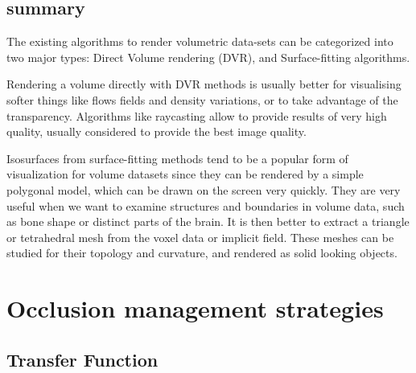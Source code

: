 \subsection{summary}
The existing algorithms to render volumetric data-sets  can be categorized into two major types: Direct Volume rendering (DVR), and Surface-fitting algorithms.


Rendering a volume directly with DVR methods is usually better for visualising softer things like flows fields and density variations, or to take advantage of the transparency. Algorithms like raycasting allow to provide results of very high quality, usually considered to provide the best image quality. 


Isosurfaces from surface-fitting methods tend to be a popular form of visualization for volume datasets since they can be rendered by a simple polygonal model, which can be drawn on the screen very quickly. They are very useful when we want to examine structures and boundaries in volume data, such as bone shape or distinct parts of the brain. It is then better to extract a triangle or tetrahedral mesh from the voxel data or implicit field. These meshes can be studied for their topology and curvature, and rendered as solid looking objects.



\section{Occlusion management strategies}



\subsection{Transfer Function}

